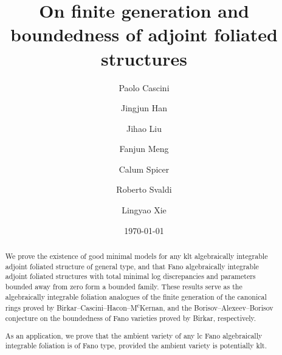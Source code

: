 \documentclass[12pt]{amsart}
\numberwithin{equation}{section}
\theoremstyle{definition}
\theoremstyle{definition}
\theoremstyle{definition}
\begin{document}
\title{On finite generation and boundedness of adjoint foliated structures}
\author{Paolo Cascini}
\author{Jingjun Han}
\author{Jihao Liu}
\author{Fanjun Meng}
\author{Calum Spicer}
\author{Roberto Svaldi}
\author{Lingyao Xie}

\date{\today}

\begin{abstract}
	We prove the existence of good minimal models for any klt algebraically integrable adjoint foliated structure of general type, and that Fano algebraically integrable adjoint foliated structures with total minimal log discrepancies and parameters bounded away from zero form a bounded family. These results serve as the algebraically integrable foliation analogues of the finite generation of the canonical rings proved by Birkar–Cascini–Hacon–M\textsuperscript{c}Kernan, and the Borisov–Alexeev–Borisov conjecture on the boundedness of Fano varieties proved by Birkar, respectively.

As an application, we prove that the ambient variety of any lc Fano algebraically integrable foliation is of Fano type, provided the ambient variety is potentially klt.
\end{abstract}

\address{Department of Mathematics, Imperial College London, 180 Queen’s
Gate, London SW7 2AZ, UK}

\address{Shanghai Center for Mathematical Sciences, Fudan University, 2005 Songhu Road, Shanghai, 200438, China}

\address{Department of Mathematics, Peking University, No. 5 Yiheyuan Road, Haidian District, Peking 100871, China}


\address{Department of Mathematics, Johns Hopkins University, 3400 N. Charles Street, Baltimore, MD 21218, USA}

\address{Department of Mathematics, King’s College London, Strand, London WC2R 2LS, UK}

\address{Dipartimento di Matematica ``F. Enriques'', Universit\`a degli Studi di Milano, Via Saldini 50, 20133 Milano (MI), Italy}
 
\address{Department of Mathematics, University of California, San Diego, 9500 Gilman Drive \# 0112, La Jolla, CA 92093-0112, USA}
\end{document}
